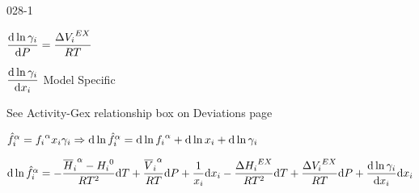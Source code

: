 \begin{mitframe}{028-1}
\begin{listone}
\begin{listtwo}
\begin{listthree}
            	\item $\dfrac{\mathrm{d}\ln\actcoeff}{\mathrm{d}\p}=\dfrac{\iipf{\vol_{\state}}^{\exfunc}}{\gasconst\Temp}$
            
           		\item $\dfrac{\mathrm{d}\ln\actcoeff}{\mathrm{d}\conjcoor}$ Model Specific
            
            	\begin{listfour}

					\item See Activity-Gex relationship box on Deviations page

				\end{listfour}

			\end{listthree}

		\end{listtwo}
        
        \item ${\hat{\fug}_{\state}}^{\tdiff}={\fug_{\state}}^{\tdiff}\conjcoor\actcoeff\Rightarrow\mathrm{d}\ln{\hat{\fug}_{\state}}^{\tdiff}=\mathrm{d}\ln{\fug_{\state}}^{\tdiff}+\mathrm{d}\ln\conjcoor+\mathrm{d}\ln\actcoeff$
        
        \item $\mathrm{d}\ln{\hat{\fug}_{\state}}^{\tdiff}=-\dfrac{{\overline{\enthalpy}_{\state}}^{\tdiff}-{\enthalpy_{\state}}^{\init}}{\gasconst\Temp^{2}}\mathrm{d}\Temp+\dfrac{{\overline{\vol}_{\state}}^{\tdiff}}{\gasconst\Temp}\mathrm{d}\p+\dfrac{1}{\conjcoor}\mathrm{d}\conjcoor-\dfrac{\iipf{\enthalpy_{\state}}^{\exfunc}}{\gasconst\Temp^{2}}\mathrm{d}\Temp+\dfrac{\iipf{\vol_{\state}}^{\exfunc}}{\gasconst\Temp}\mathrm{d}\p+\dfrac{\mathrm{d}\ln\actcoeff}{\mathrm{d}\conjcoor}\mathrm{d}\conjcoor$
    
    \end{listone}    


\end{mitframe}